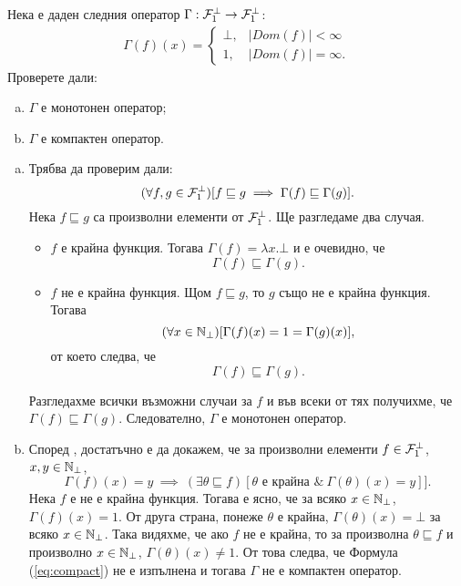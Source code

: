 \begin{problem}
  Нека е даден следния оператор $\Gamma:\mathcal{F}^\bot_1\to\mathcal{F}^\bot_1$:
  \begin{align*}
    \Gamma(f)(x) =
    \begin{cases}
      \bot, & |Dom(f)| < \infty\\
      1, & |Dom(f)| = \infty.
    \end{cases}
  \end{align*}
  Проверете дали:
  \begin{enumerate}[a)]
  \item 
    $\Gamma$ е монотонен оператор;
  \item
    $\Gamma$ е компактен оператор.
  \end{enumerate}
\end{problem}
\begin{solution}
  \begin{enumerate}[a)]
  \item 
    Трябва да проверим дали:
    \[(\forall f,g\in\mathcal{F}^\bot_1)[f \sqsubseteq g \implies \Gamma(f) \sqsubseteq \Gamma(g)].\]
    Нека $f \sqsubseteq g$ са произволни елементи от $\mathcal{F}^\bot_1$.
    Ще разгледаме два случая.
    \begin{itemize}
    \item 
      $f$ е крайна функция. Тогава $\Gamma(f) = \lambda x.\bot$ и е очевидно, че 
      \[\Gamma(f) \sqsubseteq \Gamma(g).\]
    \item
      $f$ не е крайна функция. Щом $f \sqsubseteq g$, то $g$ също не е крайна функция.
      Тогава 
      \[(\forall x \in \mathbb{N}_\bot)[\Gamma(f)(x) = 1 = \Gamma(g)(x)],\]
      от което следва, че 
      \[\Gamma(f) \sqsubseteq \Gamma(g).\]
    \end{itemize}
    Разгледахме всички възможни случаи за $f$ и във всеки от тях получихме, че $\Gamma(f) \sqsubseteq \Gamma(g)$.
    Следователно, $\Gamma$ е монотонен оператор.
  \item
    Според , достатъчно е да докажем, че за произволни елементи $f \in \mathcal{F}^\bot_1$, $x, y \in \mathbb{N}_\bot$, 
    \begin{equation}
      \label{eq:compact}
      \Gamma(f)(x) = y\ \implies\ (\exists \theta \sqsubseteq f)[\theta\text{ е крайна }\&\ \Gamma(\theta)(x) = y]].
    \end{equation}
    Нека $f$ е не е крайна функция.
    Тогава е ясно, че за всяко $x \in \mathbb{N}_\bot$, $\Gamma(f)(x) = 1$.
    От друга страна, понеже $\theta$ е крайна, $\Gamma(\theta)(x) = \bot$ за всяко $x \in \mathbb{N}_\bot$.
    Така видяхме, че ако $f$ не е крайна, то за произволна $\theta \sqsubseteq f$ и произволно $x \in \mathbb{N}_\bot$,
    $\Gamma(\theta)(x) \neq 1$.
    От това следва, че Формула (\ref{eq:compact}) не е изпълнена и тогава $\Gamma$ не е компактен оператор.  
  \end{enumerate}
\end{solution}



